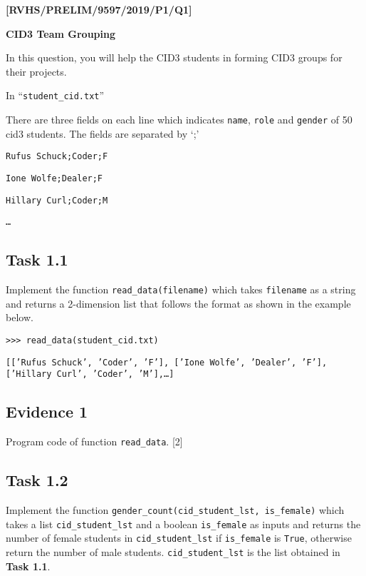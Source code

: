 \item \textbf{{[}RVHS/PRELIM/9597/2019/P1/Q1{]} }

\textbf{CID3 Team Grouping} 

In this question, you will help the CID3 students in forming CID3
groups for their projects. 

In \textquotedblleft \texttt{student\_cid.txt}\textquotedblright{} 

There are three fields on each line which indicates \texttt{name},
\texttt{role} and \texttt{gender} of 50 cid3 students. The fields
are separated by \textquoteleft ;\textquoteright{} 

\noindent %
\noindent\begin{minipage}[t]{1\columnwidth}%
\texttt{Rufus Schuck;Coder;F }

\texttt{Ione Wolfe;Dealer;F }

\texttt{Hillary Curl;Coder;M }

\texttt{\dots{} }%
\end{minipage}

\subsection*{Task 1.1 }

Implement the function \texttt{read\_data(filename)} which takes \texttt{filename}
as a string and returns a 2-dimension list that follows the format
as shown in the example below.

\noindent %
\noindent\begin{minipage}[t]{1\columnwidth}%
\texttt{>\textcompwordmark >\textcompwordmark > read\_data(\textquotedbl student\_cid.txt\textquotedbl ) }

\texttt{{[}{[}'Rufus Schuck', 'Coder', 'F'{]}, {[}'Ione Wolfe', 'Dealer',
'F'{]}, {[}'Hillary Curl', 'Coder', 'M'{]},\dots {]} }%
\end{minipage}

\subsection*{Evidence 1 }

Program code of function \texttt{read\_data}. \hfill{}{[}2{]}

\subsection*{Task 1.2}

Implement the function \texttt{gender\_count(cid\_student\_lst, is\_female)}
which takes a list \texttt{cid\_student\_lst} and a boolean \texttt{is\_female}
as inputs and returns the number of female students in \texttt{cid\_student\_lst}
if \texttt{is\_female} is \texttt{True}, otherwise return the number
of male students. \texttt{cid\_student\_lst} is the list obtained
in \textbf{Task 1.1}. 

